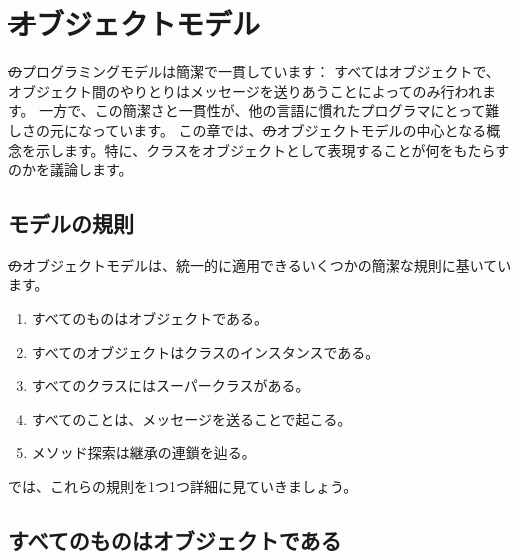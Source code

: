 \documentclass[a4paper,10pt,twoside]{book}
\begin{document}
	\renewcommand{\nnbb}[2]{} %
	\sloppy
\fi
\chapter{\st オブジェクトモデル}

\st のプログラミングモデルは簡潔で一貫しています： すべてはオブジェクトで、オブジェクト間のやりとりはメッセージを送りあうことによってのみ行われます。
一方で、この簡潔さと一貫性が、他の言語に慣れたプログラマにとって難しさの元になっています。
この章では、\st のオブジェクトモデルの中心となる概念を示します。特に、クラスをオブジェクトとして表現することが何をもたらすのかを議論します。

\section{モデルの規則}

\st のオブジェクトモデルは、統一的に適用できるいくつかの簡潔な規則に基いています。

\begin{enumerate}[label={\textbf{Rule \arabic{*}}.}, ref={Rule \arabic{*}}, leftmargin=*]
\item{} 
	すべてのものはオブジェクトである。

\item{} 
	すべてのオブジェクトはクラスのインスタンスである。

\item{}  
	すべてのクラスにはスーパークラスがある。

\item{}  
	すべてのことは、メッセージを送ることで起こる。

\item{}  
	メソッド探索は継承の連鎖を辿る。

\end{enumerate}

\noindent
では、これらの規則を1つ1つ詳細に見ていきましょう。


\section{すべてのものはオブジェクトである}
\end{document}
